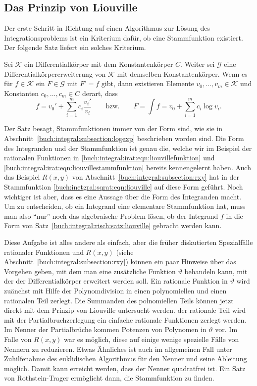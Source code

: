 %
%
%
\subsection{Das Prinzip von Liouville
\label{buch:integral:risch:subsection:liouville}}
Der erste Schritt in Richtung auf einen Algorithmus zur Lösung des
Integrationsproblems ist ein Kriterium dafür, ob eine Stammfunktion
existiert.
Der folgende Satz liefert ein solches Kriterium.

\begin{satz}
\label{buch:integral:risch:satz:liouville}
Sei $\mathcal{K}$ ein Differentialkörper mit dem Konstantenkörper $C$.
Weiter sei $\mathcal{G}$ eine Differentialkörpererweiterung von $\mathcal{K}$
mit demselben Konstantenkörper.
Wenn es für $f\in\mathcal{K}$ ein $F\in\mathcal{G}$ mit $F'=f$ gibt,
dann existieren Elemente $v_0,\dots,v_m\in\mathcal{K}$ und
Konstanten $c_0,\dots,c_m\in C$ derart, dass
\[
f = v_0' + \sum_{i=1}^m c_i\frac{v_i'}{v_i}
\qquad\text{bzw.}\qquad
F
=
\int f
=
v_0 + \sum_{i=1}^m c_i \log v_i.
\]
\end{satz}

Der Satz besagt, Stammfunktionen immer von der Form sind, wie sie in
Abschnitt~\ref{buch:integral:subsection:logexp} beschrieben worden sind.
Die Form des Integranden und der Stammfunktion ist genau die, 
welche wir im Beispiel der rationalen Funktionen in
\eqref{buch:integral:irat:eqn:liouvillefunktion}
und
\eqref{buch:integral:irat:eqn:liouvillestammfunktion}
bereits kennengelernt haben.
Auch das Beispiel $R(x,y)$ von Abschnitt~\ref{buch:integral:subsection:rxy}
hat in der Stammfunktion \eqref{buch:inetgral:sqrat:eqn:liouville}
auf diese Form geführt.
Noch wichtiger ist aber, dass es eine Aussage über die Form des
Integranden macht.
Um zu entscheiden, ob ein Integrand eine elementare Stammfunktion
hat, muss man also  ``nur'' noch das algebraische Problem lösen,
ob der Integrand $f$ in die Form von
Satz~\ref{buch:integral:risch:satz:liouville}
gebracht werden kann.

Diese Aufgabe ist alles andere als einfach, aber die früher diskutierten
Spezialfälle rationaler Funktionen und $R(x,y)$
(siehe Abschnitt~\ref{buch:integral:subsection:rxy}) können ein paar
Hinweise über das Vorgehen geben, mit dem man eine zusätzliche
Funktion $\vartheta$ behandeln kann, mit der der Differentialkörper
erweitert werden soll.
Ein rationale Funktion in $\vartheta$ wird zuänchst mit Hilfe der
Polynomdivision in einen polynomiellen und einen rationalen
Teil zerlegt.
Die Summanden des polnomiellen Teils können jetzt direkt mit
dem Prinzip von Liouville untersucht werden.
der rationale Teil wird mit der Partialbruchzerlegung ein
einfache rationale Funktionen zerlegt werden.
Im Nenner der Partialbrüche kommen Potenzen von Polynomen in $\vartheta$
vor. 
Im Falle von $R(x,y)$ war es möglich, diese auf einige wenige spezielle
Fälle von Nennern zu reduzieren.
Etwas Ähnliches ist auch im allgemeinen Fall unter Zuhilfenahme
des euklidischen Algorithmus für den Nenner und seine Ableitung möglich.
Damit kann erreicht werden, dass der Nenner quadratfrei ist.
Ein Satz von Rothstein-Trager ermöglicht dann, die Stammfunktion zu finden.

